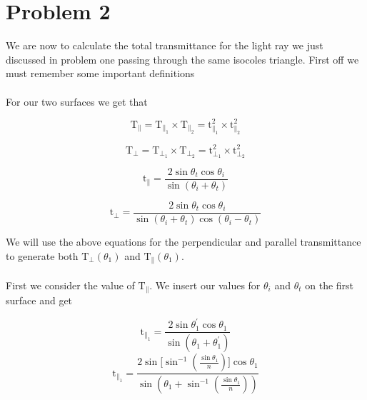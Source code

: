 \section*{Problem 2}

We are now to calculate the total transmittance for the light ray we just discussed in problem one passing through the same isocoles
triangle. First off we must remember some important definitions
\\
\\
For our two surfaces we get that

\begin{equation} \label{T_par}
	\mathrm{T}_\parallel = \mathrm{T}_{\parallel_1} \times \mathrm{T}_{\parallel_2} =
	\mathrm{t}_{\parallel_1}^2 \times \mathrm{t}_{\parallel_2}^2 
\end{equation}

\begin{equation} \label{T_per}
	\mathrm{T}_\bot = \mathrm{T}_{\bot_1} \times \mathrm{T}_{\bot_2} =
	\mathrm{t}_{\bot_1}^2 \times \mathrm{t}_{\bot_2}^2 
\end{equation}

\begin{equation} \label{t_par}
	\mathrm{t}_\parallel = \dfrac{2\sin\theta_t\cos\theta_i}{\sin(\theta_i + \theta_t)}
\end{equation}
	
\begin{equation} \label{t_per}
	\mathrm{t}_\bot = \dfrac{2\sin\theta_t\cos\theta_i}{\sin(\theta_i + \theta_t)\cos(\theta_i - \theta_t)}
\end{equation}

We will use the above equations for the perpendicular and parallel transmittance to generate both $\mathrm{T}_\bot(\theta_1)$ and 
$\mathrm{T}_\parallel(\theta_1)$. 
\\
\\ 

First we consider the value of $\mathrm{T}_\parallel$. We insert our values for $\theta_i$ and $\theta_t$ on the first surface and get 

$$
	\mathrm{t}_{\parallel_1} = \dfrac{2\sin\theta^{'}_1\cos\theta_1}{\sin(\theta_1 + \theta^{'}_1)}
$$
\begin{equation} \label{t-par-1}
	\mathrm{t}_{\parallel_1} = 
	\dfrac
	{
		2\sin\big[\sin^{-1}\left(\frac{\sin\theta_1}{n}\right)\big]\cos\theta_1
	}
	{
		\sin(\theta_1 + \sin^{-1}\left(\frac{\sin\theta_1}{n}\right))
	}
\end{equation}

